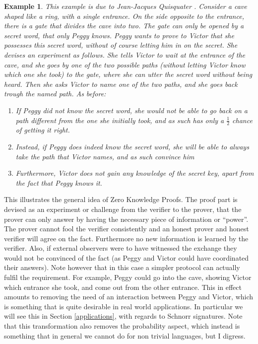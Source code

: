 \documentclass{article}
\newtheorem{example}{Example}
\begin{document}
\begin{example}
    This example is due to Jean-Jacques Quisquater \cite{quisquaterHowExplainZeroknowledge1989}.
    Consider a cave shaped like a ring, with a single entrance.
    On the side opposite to the entrance, there is a gate that divides the cave into two.
    The gate can only be opened by a secret word, that only Peggy knows.
    Peggy wants to prove to Victor that she possesses this secret word, without of course letting him in on the secret.
    She devises an experiment as follows.
    She tells Victor to wait at the entrance of the cave, and she goes by one of the two possible paths (without letting Victor know which one she took) to the gate, where she can utter the secret word without being heard.
    Then she asks Victor to name one of the two paths, and she goes back trough the named path.
    As before:
    \begin{enumerate}
        \item If Peggy did not know the secret word, she would not be able to go back on a path different from the one she initially took, and as such has only a $\frac{1}{2}$ chance of getting it right.
        \item Instead, if Peggy does indeed know the secret word, she will be able to always take the path that Victor names, and as such convince him
        \item Furthermore, Victor does not gain any knowledge of the secret key, apart from the fact that Peggy knows it.
    \end{enumerate}
\end{example}

This illustrates the general idea of Zero Knowledge Proofs. The proof part is devised as an experiment or challenge from the verifier to the prover, that the prover can only answer by having the necessary piece of information or \enquote{power}. The prover cannot fool the verifier consistently and an honest prover and honest verifier will agree on the fact. Furthermore no new information is learned by the verifier. Also, if external observers were to have witnessed the exchange they would not be convinced of the fact (as Peggy and Victor could have coordinated their answers).
Note however that in this case a simpler protocol can actually fulfil the requirement. For example, Peggy could
go into the cave, showing Victor which entrance she took, and come out from the other entrance. This in effect amounts
to removing the need of an interaction between Peggy and Victor, which is something that is quite desirable in real world
applications. In particular we will see this in Section \ref{applications}, with regards to Schnorr signatures. Note that this transformation
also removes the probability aspect, which instead is something that in general we cannot do for non trivial languages, but I digress. \par
\end{document}

